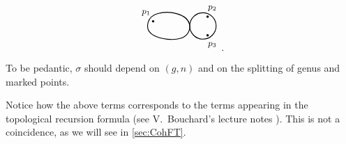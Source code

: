 \documentclass[11pt,reqno]{amsart}
\numberwithin{equation}{section}
\theoremstyle{plain}
\theoremstyle{definition}
\begin{document}
\begin{equation}
{{\begin{tikzpicture}[x=1pt,y=1pt,scale=.3]
      \draw[thick] (380, 606.6667) .. controls (402.6667, 594.6667) and (445.3333, 589.3333) .. (470.9047, 597.7485) .. controls (496.476, 606.1637) and (504.952, 628.3273) .. (500.952, 645.6607) .. controls (496.952, 662.994) and (480.476, 675.497) .. (458.9047, 681.7485) .. controls (437.3333, 688) and (410.6667, 688) .. (392, 682.6667) .. controls (373.3333, 677.3333) and (362.6667, 666.6667) .. (358.6667, 652) .. controls (354.6667, 637.3333) and (357.3333, 618.6667) .. cycle;
      \node at (376, 656) {\tiny$\bullet$};
      \node at (352, 685) {\small$p_1$};
      \draw[thick] (547.052, 640.0417) circle[radius=45.2548];
      \node at (563.052, 672.0417) {\tiny$\bullet$};
      \node at (563.052, 608.0417) {\tiny$\bullet$};
      \node at (579.052, 700) {\small$p_2$};
      \node at (579.052, 575) {\small$p_3$};
    \end{tikzpicture}
  }} \,.
\end{equation}
To be pedantic, $\sigma$ should depend on $(g,n)$ and on the splitting of genus and marked points.

Notice how the above terms corresponds to the terms appearing in the topological recursion formula (see V.~Bouchard's lecture notes \cite{Bou26}). This is not a coincidence, as we will see in \cref{sec:CohFT}.
\end{document}
